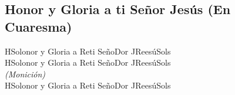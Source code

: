 \subsection{Honor y Gloria a ti Señor Jesús (En Cuaresma)}

\begin{center}
{\Large
H\ac{Sol}onor y Gloria a \ac{Re}ti Seño\ac{Do}r J\ac{Re}esú\ac{Sol}s\\
\vspace{1em}
H\ac{Sol}onor y Gloria a \ac{Re}ti Seño\ac{Do}r J\ac{Re}esú\ac{Sol}s\\

\vspace{1em}
\textit{(Monición)}\\
\vspace{1em}
H\ac{Sol}onor y Gloria a \ac{Re}ti Seño\ac{Do}r J\ac{Re}esú\ac{Sol}s\\
}
\end{center}
